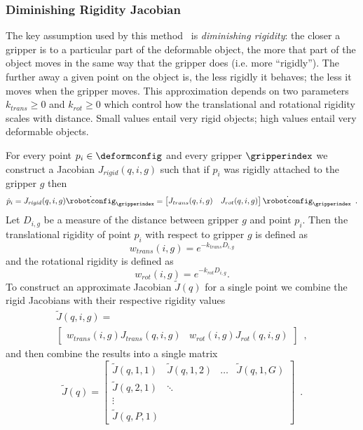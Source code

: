 \subsubsection{Diminishing Rigidity Jacobian}

The key assumption used by this method~\cite{Berenson2013} is \textit{diminishing rigidity}: the closer a gripper is to a particular part of the deformable object, the more that part of the object moves in the same way that the gripper does (i.e. more ``rigidly''). The further away a given point on the object is, the less rigidly it behaves; the less it moves when the gripper moves. This approximation depends on two parameters $k_{trans} \geq 0$ and $k_{rot} \geq 0$ which control how the translational and rotational rigidity scales with distance. Small values entail very rigid objects; high values entail very deformable objects.

For every point $p_i \in \deformconfig$ and every gripper $\gripperindex$ we construct a Jacobian $J_{rigid}(q,i,g)$ such that if $p_i$ was rigidly attached to the gripper $g$ then
\begin{equation}
    \dot p_i = J_{\mathit{rigid}}(q,i,g) \dot \robotconfig_{\gripperindex} = 
    \begin{bmatrix}J_{trans}(q,i,g) & J_{rot}(q,i,g)\end{bmatrix}
    \dot \robotconfig_{\gripperindex} \enspace .
\end{equation}
Let $D_{i,g}$ be a measure of the distance between gripper $g$ and point $p_i$. Then the translational rigidity of point $p_i$ with respect to gripper $g$ is defined as
\begin{equation}
    w_{trans}(i,g) = e^{-k_{trans}D_{i,g}}
\end{equation}
and the rotational rigidity is defined as
\begin{equation}
    w_{rot}(i,g) = e^{-k_{rot}D_{i,g}}.
\end{equation}
To construct an approximate Jacobian $\tilde J(q)$ for a single point we combine the rigid Jacobians with their respective rigidity values
\begin{multline}
    \tilde J(q,i,g) = \\
    \begin{bmatrix}w_{trans}(i,g) J_{trans}(q,i,g) & w_{rot}(i,g) J_{rot}(q,i,g)\end{bmatrix} \enspace,
\end{multline}
and then combine the results into a single matrix
\begin{equation}
    \tilde J(q) = 
    \begin{bmatrix}
        \tilde J(q,1,1) & \tilde J(q,1,2) & \dots & \tilde J(q, 1, G) \\
        \tilde J(q,2,1) & \ddots \\
        \vdots \\
        \tilde J(q,P,1)
    \end{bmatrix} \enspace .
\end{equation}


